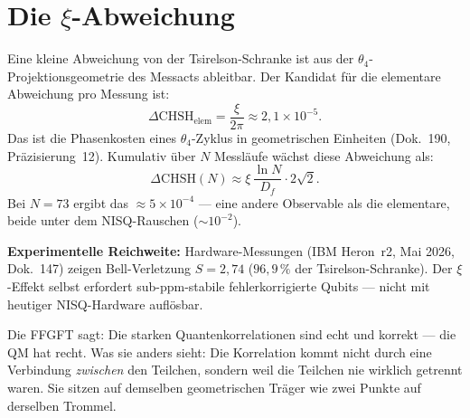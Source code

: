 \section{Die $\xi$-Abweichung}

Eine kleine Abweichung von der Tsirelson-Schranke ist aus der
$\theta_4$-Projektionsgeometrie des Messacts ableitbar. Der
Kandidat für die elementare Abweichung pro Messung ist:
\begin{equation}
  \Delta\mathrm{CHSH}_{\mathrm{elem}} = \frac{\xi}{2\pi}
  \approx 2{,}1\times10^{-5}.
\end{equation}
Das ist die Phasenkosten eines $\theta_4$-Zyklus in geometrischen
Einheiten (Dok.~190, Präzisierung~12). Kumulativ über $N$ Messläufe
wächst diese Abweichung als:
\begin{equation}
  \Delta\mathrm{CHSH}(N) \approx \xi\,\frac{\ln N}{D_f}\cdot2\sqrt2.
\end{equation}
Bei $N=73$ ergibt das $\approx5\times10^{-4}$ — eine andere
Observable als die elementare, beide unter dem NISQ-Rauschen
($\sim10^{-2}$).

\textbf{Experimentelle Reichweite:} Hardware-Messungen (IBM Heron~r2,
Mai 2026, Dok.~147) zeigen Bell-Verletzung $S=2{,}74$ ($96{,}9\,\%$
der Tsirelson-Schranke). Der $\xi$-Effekt selbst erfordert
sub-ppm-stabile fehlerkorrigierte Qubits — nicht mit heutiger
NISQ-Hardware auflösbar.

\begin{laierspur}
Die FFGFT sagt: Die starken Quantenkorrelationen sind echt und
korrekt — die QM hat recht. Was sie anders sieht: Die Korrelation
kommt nicht durch eine Verbindung \emph{zwischen} den Teilchen,
sondern weil die Teilchen nie wirklich getrennt waren. Sie sitzen
auf demselben geometrischen Träger wie zwei Punkte auf derselben
Trommel.
\end{laierspur}
